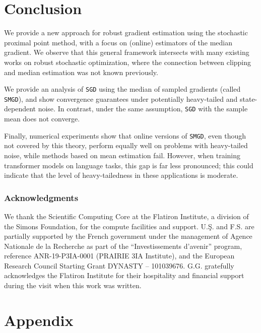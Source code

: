 \documentclass[10pt]{article} %
\newcommand{\SGD}{\texttt{SGD}}
\newcommand{\SMGD}{\texttt{SMGD}}
\begin{document}
\section{Conclusion}

We provide a new approach for robust gradient estimation using the stochastic proximal point method, with a focus on (online) estimators of the median gradient.
We observe that this general framework intersects with many existing works on robust stochastic optimization, where the connection between clipping and median estimation was not known previously. 
%

We provide an analysis of \SGD{} using the median of sampled gradients (called \SMGD{}), and show convergence guarantees under potentially heavy-tailed and state-dependent noise. In contrast, under the same assumption, \SGD{} with the sample mean does not converge.

Finally, numerical experiments show that online versions of \SMGD{}, even though not covered by this theory, perform equally well on problems with heavy-tailed noise, while methods based on mean estimation fail. However, when training transformer models on language tasks, this gap is far less pronounced; this could indicate that the level of heavy-tailedness in these applications is moderate.

\subsubsection*{Acknowledgments}
We thank the Scientific Computing Core at the Flatiron Institute, a division of the Simons Foundation, for the compute facilities and support.
% 
U.\c{S}. and F.S. are partially supported by the French government under the
management of Agence Nationale de la Recherche as part of the “Investissements d’avenir” program,
reference ANR-19-P3IA-0001 (PRAIRIE 3IA Institute), and the
European Research Council Starting Grant DYNASTY – 101039676.
G.G. gratefully acknowledges the Flatiron Institute for their hospitality and financial support during the visit when this work was written.


\clearpage





\clearpage

\tableofcontents

\appendix

\section*{Appendix}
\end{document}
